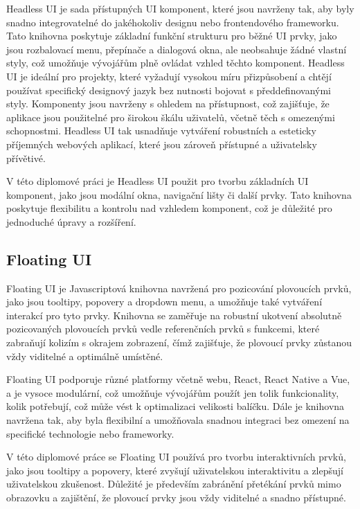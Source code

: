 Headless UI je sada přístupných UI komponent, které jsou navrženy tak, aby byly snadno integrovatelné do jakéhokoliv designu nebo frontendového frameworku. Tato knihovna poskytuje základní funkční strukturu pro běžné UI prvky, jako jsou rozbalovací menu, přepínače a dialogová okna, ale neobsahuje žádné vlastní styly, což umožňuje vývojářům plně ovládat vzhled těchto komponent. Headless UI je ideální pro projekty, které vyžadují vysokou míru přizpůsobení a chtějí používat specifický designový jazyk bez nutnosti bojovat s předdefinovanými styly. Komponenty jsou navrženy s ohledem na přístupnost, což zajišťuje, že aplikace jsou použitelné pro širokou škálu uživatelů, včetně těch s omezenými schopnostmi. Headless UI tak usnadňuje vytváření robustních a esteticky příjemných webových aplikací, které jsou zároveň přístupné a uživatelsky přívětivé.

V této diplomové práci je Headless UI použit pro tvorbu základních UI komponent, jako jsou modální okna, navigační lišty či další prvky. Tato knihovna poskytuje flexibilitu a kontrolu nad vzhledem komponent, což je důležité pro jednoduché úpravy a rozšíření.

\subsection{Floating UI}
Floating UI je Javascriptová knihovna navržená pro pozicování plovoucích prvků, jako jsou tooltipy, popovery a dropdown menu, a umožňuje také vytváření interakcí pro tyto prvky. Knihovna se zaměřuje na robustní ukotvení absolutně pozicovaných plovoucích prvků vedle referenčních prvků s funkcemi, které zabraňují kolizím s okrajem zobrazení, čímž zajišťuje, že plovoucí prvky zůstanou vždy viditelné a optimálně umístěné.

Floating UI podporuje různé platformy včetně webu, React, React Native a Vue, a je vysoce modulární, což umožňuje vývojářům použít jen tolik funkcionality, kolik potřebují, což může vést k optimalizaci velikosti balíčku. Dále je knihovna navržena tak, aby byla flexibilní a umožňovala snadnou integraci bez omezení na specifické technologie nebo frameworky. \cite{FloatingUI}

V této diplomové práce se Floating UI používá pro tvorbu interaktivních prvků, jako jsou tooltipy a popovery, které zvyšují uživatelskou interaktivitu a zlepšují uživatelskou zkušenost. Důležité je především zabránění přetékání prvků mimo obrazovku a zajištění, že plovoucí prvky jsou vždy viditelné a snadno přístupné.

